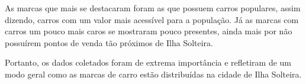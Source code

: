 \documentclass[
	12pt,				%
	oneside,			%
	a4paper,			%
	english,			%
	french,				%
	spanish,			%
	brazil,				%
	]{abntex2}
\begin{document}
As marcas que mais se destacaram foram as que possuem carros populares, assim dizendo, carros com um valor mais acessível para a população. Já as marcas com carros um pouco mais caros se mostraram pouco presentes, ainda mais por não possuírem pontos de venda tão próximos de Ilha Solteira. 

Portanto, os dados coletados foram de extrema importância e refletiram de um modo geral como as marcas de carro estão distribuídas na cidade de Ilha Solteira.  


%
%
\end{document}
